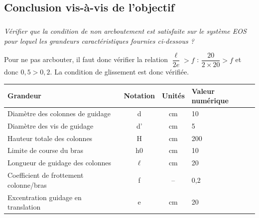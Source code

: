 \documentclass[10pt,fleqn]{article} %
\begin{document}
\begin{multicols}{2}
\subsection*{Conclusion vis-à-vis de l'objectif}
\subparagraph{}\textit{Vérifier que la condition de non arcboutement est satisfaite sur le système EOS pour lequel les grandeurs caractéristiques fournies ci-dessous ?}
\ifprof
\begin{corrige}
Pour ne pas arcbouter, il faut donc vérifier la relation $\dfrac{\ell}{2e} > f $ : $\dfrac{20}{2\times 20} > f $ et donc $0,5>0,2$.  La condition de glissement est donc vérifiée. 
\end{corrige}
\else
\fi



\ifprof
\else

\footnotesize
\noindent\begin{center}
\begin{tabular}{|p{2.6cm}|c|c|p{1.5cm}|}
\hline
Grandeur & Notation & Unités & Valeur numérique \\ \hline
Diamètre des colonnes  de guidage & d & cm & 10 \\ \hline
Diamètre des vis de guidage & d' & cm & 5 \\ \hline
Hauteur totale des colonnes & H & cm & 200 \\ \hline
Limite de course du bras & h0 & cm & 10 \\ \hline
Longueur de guidage des colonnes & $\ell$  & cm & 20 \\ \hline
Coefficient de frottement colonne/bras & f & -- & 0,2 \\ \hline
Excentration guidage en translation & e & cm & 20 \\ \hline
\end{tabular}
\end{center}

\normalsize

\fi



\ifprof
\else

\end{multicols}
 
\fi
\end{document}
